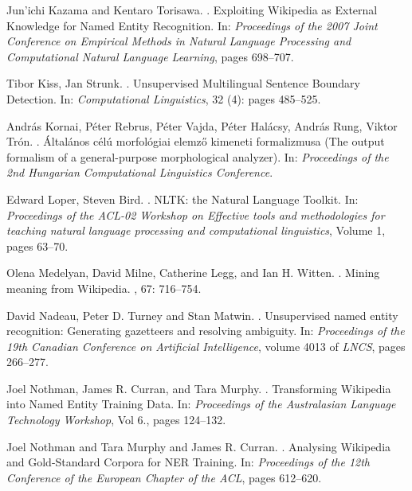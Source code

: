 \documentclass[11pt]{article}
\begin{document}
\begin{thebibliography}{}
Jun'ichi Kazama and Kentaro Torisawa.
.
\newblock Exploiting Wikipedia as External Knowledge for Named Entity Recognition.
\newblock In: {\em Proceedings of the 2007 Joint Conference on Empirical Methods in Natural Language Processing and Computational Natural Language Learning}, pages 698--707.

Tibor Kiss, Jan Strunk.
.
\newblock Unsupervised Multilingual Sentence Boundary Detection. 
\newblock In: {\em Computational Linguistics}, 32 (4): pages 485--525.

András Kornai, Péter Rebrus, Péter Vajda, Péter Halácsy, András Rung, Viktor Trón.
.
\newblock Általános célú morfológiai elemző kimeneti formalizmusa (The output formalism of a general-purpose morphological analyzer).
\newblock In: {\em Proceedings of the 2nd Hungarian Computational Linguistics Conference}.

Edward Loper, Steven Bird.
.
\newblock NLTK: the Natural Language Toolkit. 
\newblock In: {\em Proceedings of the ACL-02 Workshop on Effective tools and methodologies for teaching natural language processing and computational linguistics}, Volume 1, pages 63--70.

Olena Medelyan, David Milne, Catherine Legg, and Ian H. Witten.
.
\newblock Mining meaning from Wikipedia.
, 67: 716--754.

David Nadeau, Peter D. Turney and Stan Matwin.
.
\newblock Unsupervised named entity recognition: Generating gazetteers and resolving ambiguity. 
\newblock In: {\em Proceedings of the 19th Canadian Conference on Artificial Intelligence}, volume 4013 of {\em LNCS}, pages 266--277.

Joel Nothman, James R. Curran, and Tara Murphy.
.
\newblock Transforming Wikipedia into Named Entity Training Data.
\newblock In: {\em Proceedings of the Australasian Language Technology Workshop}, Vol 6., pages 124--132.

Joel Nothman and Tara Murphy and James R. Curran.
.
\newblock Analysing Wikipedia and Gold-Standard Corpora for NER Training.
\newblock In: {\em Proceedings of the 12th Conference of the European Chapter of the ACL}, pages 612--620.


\end{thebibliography}
\end{document}
